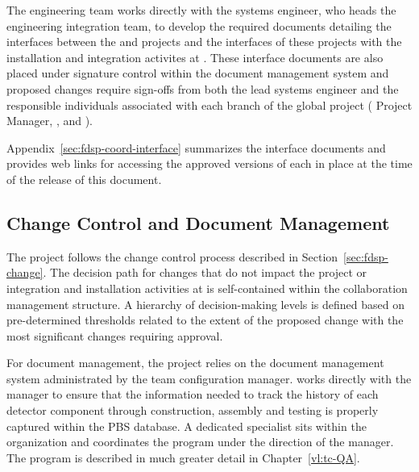 The  engineering team works directly with the
 systems engineer, who heads the  engineering
integration team, to develop the required documents detailing the
interfaces between the  and  projects and the interfaces
of these projects with the  installation and integration
activites at .  These  interface documents are
also placed under signature control within the 
document management system and proposed changes require sign-offs
from both the lead  systems engineer and the responsible
individuals associated with each branch of the global project
( Project Manager,  , and
).

Appendix~\ref{sec:fdsp-coord-interface} summarizes the interface documents
and provides web links for accessing the approved versions of each
in place at the time of the release of this document.

 
\subsection{Change Control and Document Management}

The  project follows the  change control process
described in Section~\ref{sec:fdsp-change}.  The decision path for
changes that do not impact the  project or 
integration and installation activities at  is
self-contained within the  collaboration management
structure.  A hierarchy of decision-making levels is defined based
on pre-determined thresholds related to the extent of the proposed
change with the most significant changes requiring 
 approval.

For document management, the  project relies on the 
document management system administrated by the 
team configuration manager.   works directly with the 
 manager to ensure that the information needed to track the history
of each detector component through construction, assembly and testing
is properly captured within the PBS database.  A dedicated 
 specialist sits within the  organization and coordinates the
  program under the direction of the
  manager.  The   program
is described in much greater detail in Chapter~\ref{vl:tc-QA}.

